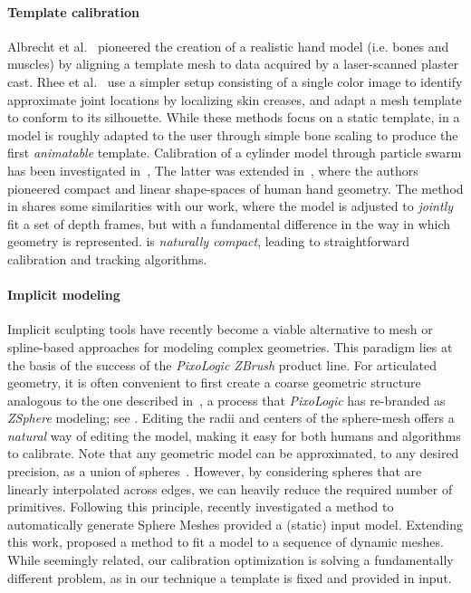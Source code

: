 \paragraph{Template calibration}
Albrecht et al.~ pioneered the creation of a realistic hand model (i.e. bones and muscles) by aligning a template mesh to data acquired by a laser-scanned plaster cast. Rhee et al.~ use a simpler setup consisting of a single color image to identify approximate joint locations by localizing skin creases, and adapt a mesh template to conform to its silhouette. While these methods focus on a static template, in \cite{delagorce2011model} a model is roughly adapted to the user through simple bone scaling to produce the first \emph{animatable} template. 
% 
Calibration of a cylinder model through particle swarm has been investigated in~\cite{makris2015adapt}, 
% 
The latter was extended in~\cite{khamis15learning}, where the authors pioneered compact and linear shape-spaces of human hand geometry.
% 
The method in \cite{taylor2014user} shares some similarities with our work, where the model is adjusted to \emph{jointly} fit a set of depth frames, but with a fundamental difference in the way in which geometry is represented.  is \emph{naturally compact}, leading to straightforward calibration and tracking algorithms.

\paragraph{Implicit modeling}
Implicit sculpting tools have recently become a viable alternative to mesh or spline-based approaches for modeling complex geometries. This paradigm lies at the basis of the success of the \emph{PixoLogic ZBrush} product line. 
For articulated geometry, it is often convenient to first create a coarse geometric structure analogous to the one described in~, a process that \emph{PixoLogic} has re-branded as \emph{ZSphere{}} modeling; see . Editing the radii and centers of the sphere-mesh offers a \emph{natural} way of editing the model, making it easy for both humans and algorithms to calibrate.
%
Note that any geometric model can be approximated, to any desired precision, as a union of spheres~\cite{tagliasacchi2016skeletons}. 
However, by considering spheres that are linearly interpolated across edges, we can heavily reduce the required number of primitives. Following this principle, \cite{thiery2013sphere} recently investigated a method to automatically generate Sphere Meshes provided a  (static) input model. Extending this work, \cite{thiery2016spheremesh} proposed a method to fit a model to a sequence of dynamic meshes. 
% 
While seemingly related, our calibration optimization is solving a fundamentally different problem, as in our technique a template is fixed and provided in input.
